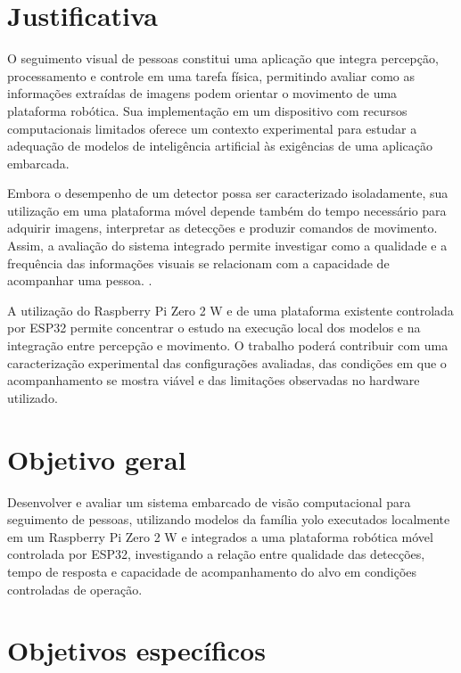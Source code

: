 \section{Justificativa}
\label{sec:justificativa}

O seguimento visual de pessoas constitui uma aplicação que integra percepção, processamento e controle em uma tarefa física, permitindo avaliar como as informações extraídas de imagens podem orientar o movimento de uma plataforma robótica. Sua implementação em um dispositivo com recursos computacionais limitados oferece um contexto experimental para estudar a adequação de modelos de inteligência artificial às exigências de uma aplicação embarcada.

Embora o desempenho de um detector possa ser caracterizado isoladamente, sua utilização em uma plataforma móvel depende também do tempo necessário para adquirir imagens, interpretar as detecções e produzir comandos de movimento. Assim, a avaliação do sistema integrado permite investigar como a qualidade e a frequência das informações visuais se relacionam com a capacidade de acompanhar uma pessoa. .

A utilização do Raspberry Pi Zero 2 W e de uma plataforma existente controlada por ESP32 permite concentrar o estudo na execução local dos modelos e na integração entre percepção e movimento. O trabalho poderá contribuir com uma caracterização experimental das configurações avaliadas, das condições em que o acompanhamento se mostra viável e das limitações observadas no hardware utilizado.

\section{Objetivo geral}
\label{sec:objetivo-geral}

Desenvolver e avaliar um sistema embarcado de visão computacional para seguimento de pessoas, utilizando modelos da família \gls{yolo} executados localmente em um Raspberry Pi Zero 2 W e integrados a uma plataforma robótica móvel controlada por ESP32, investigando a relação entre qualidade das detecções, tempo de resposta e capacidade de acompanhamento do alvo em condições controladas de operação.

\section{Objetivos específicos}
\label{sec:objetivos-especificos}

